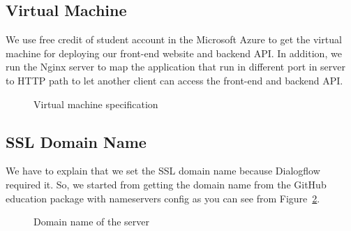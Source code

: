 \documentclass[12pt,oneside,openright,a4paper]{cpe-english-project}
\begin{document}
\subsection{Virtual Machine}
We use free credit of student account in the Microsoft Azure to get
the virtual machine for deploying our front-end website and backend API.
In addition, we run the Nginx server to map the application that run in
different port in server to HTTP path to let another client can access the
front-end and backend API.
\begin{figure}[!h]\centering
	\caption{Virtual machine specification}\label{fig:Virtual machine specification}
\end{figure}

\pagebreak
\subsection{SSL Domain Name}
We have to explain that we set the SSL domain name because Dialogflow required it.
So, we started from getting the domain name from the GitHub education package with
nameservers config as you can see from Figure~\ref*{fig:Domain name of the server}.

\begin{figure}[!h]\centering
	\caption{Domain name of the server}\label{fig:Domain name of the server}
\end{figure}
\end{document}
